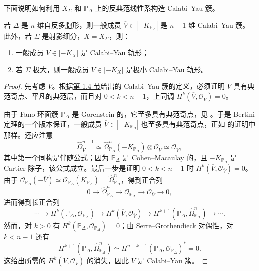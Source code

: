 下面说明如何利用 $X_\Sigma$ 和 $\mathbb P_\Delta$ 上的反典范线性系构造 Calabi--Yau 簇。

\begin{proposition}\label{prop:toric-cy-construction}
若 $\Delta$ 是 $n$ 维自反多胞形，则一般成员 $\overline V\in|-K_{\mathbb P_\Delta}|$ 是 $n-1$ 维 Calabi--Yau 簇。此外，若 $\Sigma$ 是射影细分，$X=X_\Sigma$，则：
\begin{enumerate}[label=(\roman*)]
\item 一般成员 $V\in|-K_X|$ 是 Calabi--Yau 轨形；
\item 若 $\Sigma$ 极大，则一般成员 $V\in|-K_X|$ 是极小 Calabi--Yau 轨形。
\end{enumerate}
\end{proposition}
\begin{proof}
先考虑 $\overline V$。根据\hyperref[sec:math-preview]{第 1.4 节}给出的 Calabi--Yau 簇的定义，必须证明 $\overline V$ 具有典范奇点、平凡的典范层，而且对 $0<k<n-1$，上同调 $H^k(\overline V,\mathcal O_{\overline V})=0$。

由于 Fano 环面簇 $\mathbb P_\Delta$ 是 Gorenstein 的，它至多具有典范奇点，见 。于是 Bertini 定理的一个版本保证，一般成员 $\overline V\in|-K_{\mathbb P_\Delta}|$ 也至多具有典范奇点，正如  的证明中那样。还应注意
\[
\widehat\Omega_{\overline V}^{n-1}
\simeq\widehat\Omega_{\mathbb P_\Delta}^{n}
(-K_{\mathbb P_\Delta})\otimes\mathcal O_{\overline V}
\simeq\mathcal O_{\overline V},
\]
其中第一个同构是伴随公式；因为 $\mathbb P_\Delta$ 是 Cohen--Macaulay 的，且 $-K_{\mathbb P_\Delta}$ 是 Cartier 除子，该公式成立。最后一步是证明 $0<k<n-1$ 时 $H^k(\overline V,\mathcal O_{\overline V})=0$。由于
$\mathcal O_{\mathbb P_\Delta}(-\overline V)\simeq\mathcal O_{\mathbb P_\Delta}(K_{\mathbb P_\Delta})=\widehat\Omega_{\mathbb P_\Delta}^n$，得到正合列
\[
0\longrightarrow\widehat\Omega_{\mathbb P_\Delta}^n
\longrightarrow\mathcal O_{\mathbb P_\Delta}
\longrightarrow\mathcal O_{\overline V}\longrightarrow0,
\]
进而得到长正合列
\[
\cdots\longrightarrow H^k(\mathbb P_\Delta,\mathcal O_{\mathbb P_\Delta})
\longrightarrow H^k(\overline V,\mathcal O_{\overline V})
\longrightarrow H^{k+1}(\mathbb P_\Delta,\widehat\Omega_{\mathbb P_\Delta}^n)
\longrightarrow\cdots.
\]
然而，对 $k>0$ 有 $H^k(\mathbb P_\Delta,\mathcal O_{\mathbb P_\Delta})=0$；由 Serre--Grothendieck 对偶性，对 $k<n-1$ 还有
\[
H^{k+1}(\mathbb P_\Delta,\widehat\Omega_{\mathbb P_\Delta}^n)
\simeq H^{n-k-1}(\mathbb P_\Delta,\mathcal O_{\mathbb P_\Delta})^*=0.
\]
这给出所需的 $H^k(\overline V,\mathcal O_{\overline V})$ 的消失，因此 $\overline V$ 是 Calabi--Yau 簇。


\end{proof}
